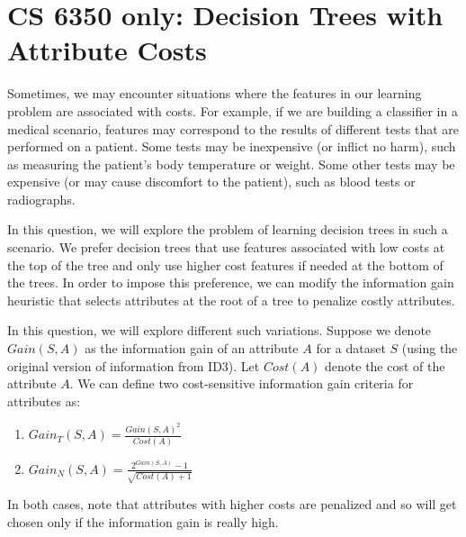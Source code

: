 \section{CS 6350 only: Decision Trees with Attribute Costs}
\label{q4}

\noindent[10 points] Sometimes, we may encounter situations where
the features in our learning problem are associated with costs. For
example, if we are building a classifier in a medical scenario,
features may correspond to the results of different tests that are
performed on a patient. Some tests may be inexpensive (or inflict no
harm), such as measuring the patient's body temperature or
weight. Some other tests may be expensive (or may cause discomfort
to the patient), such as blood tests or radiographs.

In this question, we will explore the problem of learning decision
trees in such a scenario. We prefer decision trees that use features
associated with low costs at the top of the tree and only use higher
cost features if needed at the bottom of the trees.  In order to
impose this preference, we can modify the information gain heuristic
that selects attributes at the root of a tree to penalize costly
attributes.

In this question, we will explore different such variations. Suppose
we denote $Gain(S, A)$ as the information gain of an attribute $A$
for a dataset $S$ (using the original version of information from
ID3). Let $Cost(A)$ denote the cost of the attribute $A$. We can
define two cost-sensitive information gain criteria for attributes
as:

\begin{enumerate}
\item $Gain_T(S, A) = \frac{Gain(S, A)^2}{Cost(A)}$

\item  $Gain_N(S, A) = \frac{2^{Gain(S, A)} - 1}{\sqrt{Cost(A) + 1}}$
\end{enumerate}

In both cases, note that attributes with higher costs are penalized
and so will get chosen only if the information gain is really high.


